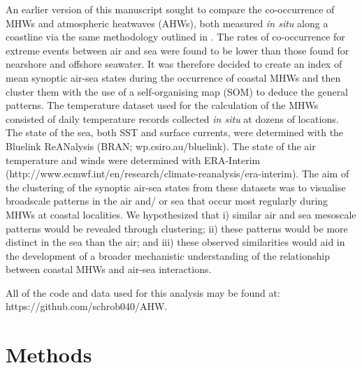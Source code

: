 \documentclass[a4paper,10pt,review]{elsarticle}
\begin{document}
An earlier version of this manuscript sought to compare the co-occurrence of MHWs and atmospheric heatwaves (AHWs), both measured \emph{in situ} along a coastline via the same methodology outlined in \citet{Schlegel2016}. The rates of co-occurrence for extreme events between air and sea were found to be lower than those found for nearshore and offshore seawater. It was therefore decided to create an index of mean synoptic air-sea states during the occurrence of coastal MHWs and then cluster them with the use of a self-organising map (SOM) to deduce the general patterns. The temperature dataset used for the calculation of the MHWs consisted of daily temperature records collected \emph{in situ} at dozens of locations. The state of the sea, both SST and surface currents, were determined with the Bluelink ReANalysis (BRAN; wp.csiro.au/bluelink). The state of the air temperature and winds were determined with ERA-Interim (http://www.ecmwf.int/en/research/climate-reanalysis/era-interim). The aim of the clustering of the synoptic air-sea states from these datasets was to visualise broadscale patterns in the air and/ or sea that occur most regularly during MHWs at coastal localities. We hypothesized that i) similar air and sea mesoscale patterns would be revealed through clustering; ii) these patterns would be more distinct in the sea than the air; and iii) these observed similarities would aid in the development of a broader mechanistic understanding of the relationship between coastal MHWs and air-sea interactions.

All of the code and data used for this analysis may be found at: https://github.com/schrob040/AHW.

\section{Methods}
\end{document}
